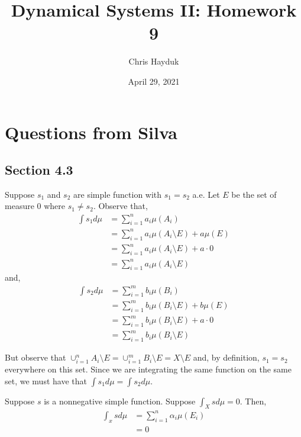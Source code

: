 \documentclass[12pt]{article}
\newenvironment{problem}[2][Problem]{\begin{trivlist}
\item[\hskip \labelsep {\bfseries #1}\hskip \labelsep {\bfseries #2.}]}{\end{trivlist}}
\begin{document}
\title{Dynamical Systems II: Homework 9}

\author{Chris Hayduk}
\date{April 29, 2021}

\maketitle

\section{Questions from Silva}

\subsection{Section 4.3}

\begin{problem}{1}
\end{problem}

Suppose $s_1$ and $s_2$ are simple function with $s_1 = s_2$ a.e. Let $E$ be the set of measure $0$ where $s_1 \neq s_2$. Observe that,
\begin{align*}
\int s_1 d\mu &= \sum_{i=1}^n a_{i} \mu(A_i)\\
&= \sum_{i=1}^n a_{i} \mu(A_i \setminus E) + a \mu(E)\\
&= \sum_{i=1}^n a_{i} \mu(A_i \setminus E) + a \cdot 0\\
&= \sum_{i=1}^n a_{i} \mu(A_i \setminus E)
\end{align*}
and,
\begin{align*}
\int s_2 d\mu &= \sum_{i=1}^m b_{i} \mu(B_i)\\
&= \sum_{i=1}^m b_{i} \mu(B_i \setminus E) + b \mu(E)\\
&= \sum_{i=1}^m b_{i} \mu(B_i \setminus E) + a \cdot 0\\
&= \sum_{i=1}^m b_{i} \mu(B_i \setminus E)
\end{align*}

But observe that $\cup_{i=1}^n A_i \setminus E = \cup_{i=1}^m B_i \setminus E = X \setminus E$ and, by definition, $s_1 = s_2$ everywhere on this set. Since we are integrating the same function on the same set, we must have that $\int s_1 d \mu = \int s_2 d \mu$.
\newpage

\begin{problem}{3}
\end{problem}

Suppose $s$ is a nonnegative simple function. Suppose $\int_X s d\mu = 0$. Then,
\begin{align*}
\int_x s d\mu &= \sum_{i=1}^n \alpha_i \mu(E_i)\\
&= 0
\end{align*}
\end{document}
